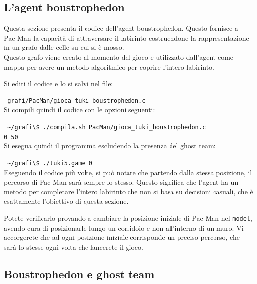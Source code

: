 \documentclass[8pt]{book}
\begin{document}

\subsection{L'agent boustrophedon}

Questa sezione presenta il codice dell'agent boustrophedon. Questo fornisce a Pac-Man la capacità di attraversare il labirinto costruendone la rappresentazione in un grafo dalle celle su cui si è mosso.\\
Questo grafo viene creato al momento del gioco e utilizzato dall'agent come mappa per avere un metodo algoritmico per coprire l'intero labirinto.

Si editi il codice e lo si salvi nel file:

\texttt{
\newline
  grafi/PacMan/gioca\_tuki\_boustrophedon.c
}\\

Si compili quindi il codice con le opzioni seguenti:

\texttt{
\newline
\textasciitilde{}/grafi\textbackslash{}\$ ./compila.sh PacMan/gioca\_tuki\_boustrophedon.c\\ 0 50
}\\

Si esegua quindi il programma escludendo la presenza del ghost team:

\texttt{
\newline
\textasciitilde{}/grafi\textbackslash{}\$ ./tuki5.game 0
}\\

Eseguendo il codice più volte, si può notare che partendo dalla stessa posizione, il percorso di Pac-Man sarà sempre lo stesso. Questo significa che l'agent ha un metodo per completare l'intero labirinto che non si basa su decisioni casuali, che è esattamente l'obiettivo di questa sezione.

Potete verificarlo provando a cambiare la posizione iniziale di Pac-Man nel \texttt{model}, avendo cura di posizionarlo lungo un corridoio e non all'interno di un muro. Vi accorgerete che ad ogni posizione iniziale corrisponde un preciso percorso, che sarà lo stesso ogni volta che lancerete il gioco.

\subsection{Boustrophedon e ghost team}\label{tocux5f36}
\end{document}
